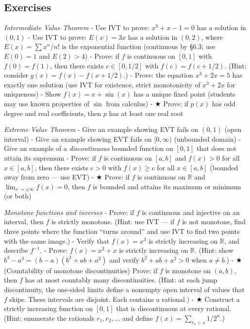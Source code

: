 \documentclass[
  10pt,
  letterpaper,
]{scrbook}
\newcommand{\RR}{\mathbb{R}}
\begin{document}
\subsection{Exercises}\label{exercises-27}

\emph{Intermediate Value Theorem} - Use IVT to prove:
\(x^3 + x - 1 = 0\) has a solution in \((0, 1)\) - Use IVT to prove:
\(E(x) = 3x\) has a solution in \((0, 2)\), where \(E(x) = \sum x^n/n!\)
is the exponential function (continuous by §6.3; use \(E(0) = 1\) and
\(E(2) > 4\)) - Prove: if \(f\) is continuous on \([0,1]\) with
\(f(0) = f(1)\), then there exists \(c \in [0, 1/2]\) with
\(f(c) = f(c + 1/2)\). (Hint: consider \(g(x) = f(x) - f(x + 1/2)\).) -
Prove: the equation \(x^3 + 2x = 5\) has exactly one solution (use IVT
for existence, strict monotonicity of \(x^3 + 2x\) for uniqueness) -
Show \(f(x) = x + \sin(x)\) has a unique fixed point (students may use
known properties of \(\sin\) from calculus) - ★ Prove: if \(p(x)\) has
odd degree and real coefficients, then \(p\) has at least one real root

\emph{Extreme Value Theorem} - Give an example showing EVT fails on
\((0, 1)\) (open interval) - Give an example showing EVT fails on
\([0, \infty)\) (unbounded domain) - Give an example of a
\emph{discontinuous} bounded function on \([0,1]\) that does not attain
its supremum - Prove: if \(f\) is continuous on \([a,b]\) and
\(f(x) > 0\) for all \(x \in [a,b]\), then there exists \(c > 0\) with
\(f(x) \geq c\) for all \(x \in [a,b]\) (bounded away from zero --- use
EVT) - ★ Prove: if \(f\) is continuous on \(\RR\) and
\(\lim_{x \to \pm\infty} f(x) = 0\), then \(f\) is bounded and attains
its maximum or minimum (or both)

\emph{Monotone functions and inverses} - Prove: if \(f\) is continuous
and injective on an interval, then \(f\) is strictly monotone. (Hint:
use IVT --- if \(f\) is not monotone, find three points where the
function ``turns around'' and use IVT to find two points with the same
image.) - Verify that \(f(x) = x^3\) is strictly increasing on \(\RR\),
and describe \(f^{-1}\). - Prove: \(f(x) = x^3 + x\) is strictly
increasing on \(\RR\). (Hint: show
\(b^3 - a^3 = (b - a)(b^2 + ab + a^2)\) and verify
\(b^2 + ab + a^2 > 0\) when \(a \neq b\).) - ★ (Countability of monotone
discontinuities) Prove: if \(f\) is monotone on \((a,b)\), then \(f\)
has at most countably many discontinuities. (Hint: at each jump
discontinuity, the one-sided limits define a nonempty open interval of
values that \(f\) skips. These intervals are disjoint. Each contains a
rational.) - ★ Construct a strictly increasing function on \([0,1]\)
that is discontinuous at every rational. (Hint: enumerate the rationals
\(r_1, r_2, \ldots\) and define \(f(x) = \sum_{r_n < x} 1/2^n\).)
\end{document}
